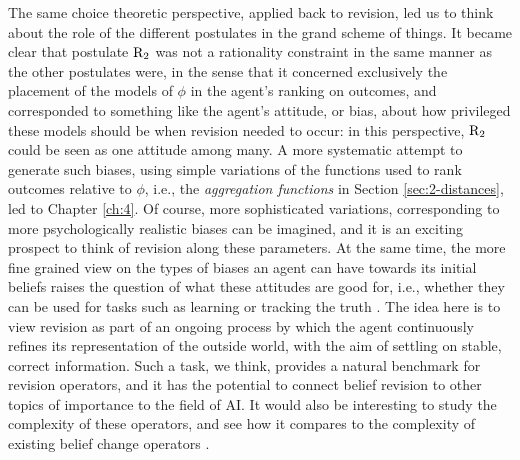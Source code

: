 The same choice theoretic perspective, applied back to revision,
led us to think about the role of the different postulates in 
the grand scheme of things. It became clear that postulate $\mathrm{R}_{2}$
was not a rationality constraint in the same manner as the other postulates were,
in the sense that it concerned exclusively the placement of the models of $\phi$
in the agent's ranking on outcomes, and corresponded to something like the agent's 
attitude, or bias, about how privileged these models should be when revision needed to occur:
in this perspective, $\mathrm{R}_{2}$ could be seen as one attitude among many.
A more systematic attempt to generate such biases, using simple variations of the 
functions used to rank outcomes relative to $\phi$, 
i.e., the \emph{aggregation functions} in Section \ref{sec:2-distances},
led to Chapter \ref{ch:4}.
Of course, more sophisticated variations,
corresponding to more psychologically realistic biases
can be imagined, and it is an exciting prospect to 
think of revision along these parameters.
At the same time,
the more fine grained view on the types of biases
an agent can have towards its initial beliefs raises the question of what these attitudes 
are good for, i.e., whether they can be used for tasks 
such as learning or tracking the truth \cite{Kelly98,BaltagGS19}.
The idea here is to view 
revision as part of an ongoing process by which the agent 
continuously refines its representation of the outside 
world,
with the aim of settling on stable, correct information.
Such a task, we think, provides a natural benchmark for revision operators,
and it has the potential to connect belief revision 
to other topics of importance to
the field of AI.
It would also be interesting to study the complexity of these operators,
and see how it compares to the complexity of 
existing belief change operators \cite{EiterG92,PfandlerRWW15}.

